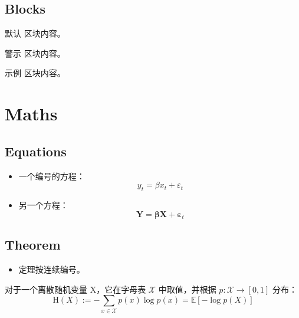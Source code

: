 \documentclass[
    11pt,
    notheorems,
    hyperref={pdfauthor=whatever}
]{beamer}
\begin{document}
\subsection{Blocks}
\begin{frame}
    \centering
    \begin{minipage}[b]{0.5\textwidth}
        \begin{block}{默认}
            区块内容。
        \end{block}

        \begin{alertblock}{警示}
            区块内容。
        \end{alertblock}

        \begin{exampleblock}{示例}
            区块内容。
        \end{exampleblock}
    \end{minipage}
\end{frame}

\section{Maths}
\subsection{Equations}
\begin{frame}
    \begin{itemize}
        \item 一个编号的方程：
        \begin{equation}
            y_t = \beta x_t + \varepsilon_t
        \end{equation}
        \item 另一个方程：
        \begin{equation*}
            \mathbf{Y} = \boldsymbol{\beta} \mathbf{X} + \boldsymbol{\varepsilon}_t
        \end{equation*}
    \end{itemize}
\end{frame}

\subsection{Theorem}
\begin{frame}
    \begin{itemize}
        \item 定理按连续编号。
    \end{itemize}
    \begin{theorem}[示例定理]
        对于一个离散随机变量 X，它在字母表 \(\mathcal{X}\) 中取值，并根据 \(p:{\mathcal {X}}\to [0,1]\) 分布：
        \begin{equation}
            \mathrm {H} (X):=-\sum _{x\in {\mathcal {X}}}p(x)\log p(x)=\mathbb {E} [-\log p(X)]
        \end{equation}
    \end{theorem}
\end{frame}
\end{document}
